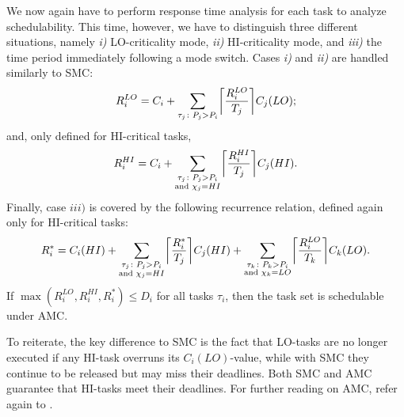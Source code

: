 \documentclass[a4paper,oneside]{csthesis}
\DeclarePairedDelimiter{\ceil}{\lceil}{\rceil}
\begin{document}
We now again have to perform response time analysis for each task to analyze schedulability. This time, however, we have to distinguish three different situations, namely \textit{i)} LO-criticality mode, \textit{ii)} HI-criticality mode, and \textit{iii)} the time period immediately following a mode switch. Cases \textit{i)} and \textit{ii)} are handled similarly to SMC: 
\begin{equation*}
    R_i^{LO} = C_i + \sum_{\tau_j \colon P_j > P_i} \ceil[\bigg]{\frac{R_i^{LO}}{T_j}} C_j(LO);
\end{equation*}
and, only defined for HI-critical tasks,
\begin{equation*}
    R_i^{HI} = C_i + \sum_{\substack{\tau_j \colon P_j > P_i \\ \text{and } \chi_j = HI }} \ceil[\bigg]{\frac{R_i^{HI}}{T_j}} C_j(HI).
\end{equation*}
Finally, case $iii)$ is covered by the following recurrence relation, defined again only for HI-critical tasks:
\begin{equation*}
    R_i^* = C_i(HI) + \sum_{\substack{\tau_j \colon P_j > P_i \\ \text{and } \chi_j = HI }} \ceil[\bigg]{\frac{R_i^*}{T_j}} C_j(HI) + \sum_{\substack{\tau_k \colon P_k > P_i \\ \text{and } \chi_k = LO }} \ceil[\bigg]{\frac{R_i^{LO}}{T_k}} C_k(LO).
\end{equation*}
If $\max{\left(R_i^{LO}, R_i^{HI}, R_i^* \right)} \leq D_i$ for all tasks $\tau_i$, then the task set is schedulable under AMC.

To reiterate, the key difference to SMC is the fact that LO-tasks are no longer executed if any HI-task overruns its $C_i(LO)$-value, while with SMC they continue to be released but may miss their deadlines. Both SMC and AMC guarantee that HI-tasks meet their deadlines. For further reading on AMC, refer again to \cite{baruah2011response}.
\end{document}
